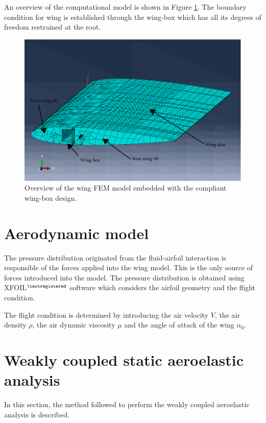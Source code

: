     An overview of the computational model is shown in Figure \ref{fig:wing}. The boundary condition for wing is established through the wing-box which has all its degrees of freedom restrained at the root.

    \begin{figure}[!htpb]
      \centering
      \includegraphics[width=0.7 \textwidth]{figures/wing-model/wing}
      \caption[Overview of the wing FEM model embedded with the compliant wing-box design]{Overview of the wing FEM model embedded with the compliant wing-box design.}
      \label{fig:wing}
    \end{figure}

  \clearpage
  \section{Aerodynamic model} \label{sec:aerodynamic_aeroelastic}

    The pressure distribution originated from the fluid-airfoil interaction is responsible of the forces applied into the wing model. This is the only source of forces introduced into the model. The pressure distribution is obtained using XFOIL$^{\textregistered}$ software which considers the airfoil geometry and the flight condition.

    The flight condition is determined by introducing the air velocity $V$, the air density $\rho$, the air dynamic viscosity $\mu$ and the angle of attack of the wing $\alpha_0$.

  \clearpage
  \section{Weakly coupled static aeroelastic analysis} \label{sec:aeroelastic_aeroelastic}

    In this section, the method followed to perform the weakly coupled aeroelastic analysis is described. 


